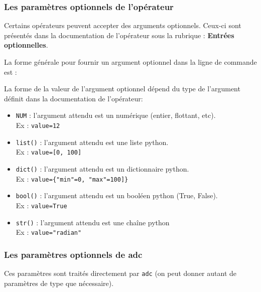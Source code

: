 \subsubsection{Les paramètres optionnels de l'opérateur}
\label{sec:param_opt_oper}
Certains opérateurs peuvent accepter des arguments optionnels.
Ceux-ci sont présentés dans la documentation de l'opérateur sous la rubrique :
\textbf {Entrées optionnelles}.

La forme générale pour fournir un argument optionnel dans la ligne de commande
est : 
\medbreak

La forme de la valeur de l'argument optionnel dépend du type de l'argument
définit dans la documentation de l'opérateur:

\begin{itemize}
  \item[•] \texttt{NUM}    : l'argument attendu est un numérique (entier,
                             flottant, etc). \\
                             Ex : \texttt{value=12}

  \item[•] \texttt{list()} : l'argument attendu est une liste python. \\
                             Ex : \texttt{value=[0, 100]}

  \item[•] \texttt{dict()} : l'argument attendu est un dictionnaire python. \\
                             Ex : \texttt{value=\{"min"=0, "max"=100]\}}

  \item[•] \texttt{bool()} : l'argument attendu est un booléen python
                             (True, False). \\
                             Ex : \texttt{value=True}

  \item[•] \texttt{str()}  : l'argument attendu est une chaîne python \\
                             Ex : \texttt{value="radian"}

\end{itemize}

\subsubsection{Les paramètres optionnels de adc}
\label{sec:param_opt_adc}

Ces paramètres sont traités directement par \texttt{adc} (on peut donner
autant de paramètres de type que nécessaire).

